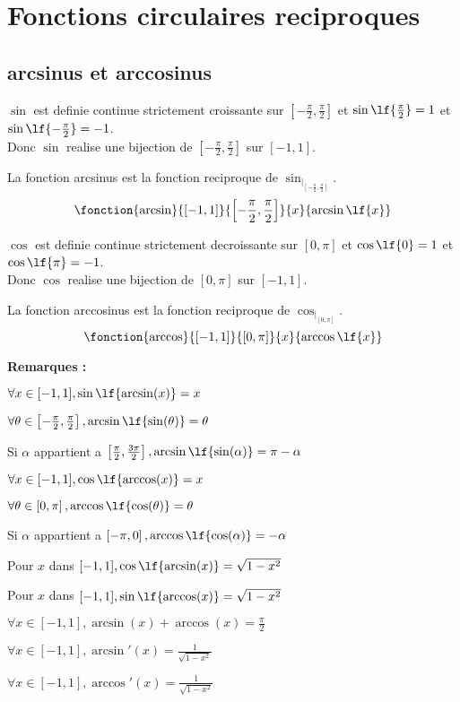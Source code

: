 \documentclass[12pt,twoside,a4paper]{article}
\begin{document}
	\section{Fonctions circulaires reciproques}
		\subsection{arcsinus et arccosinus}
			$\sin$ est definie continue strictement croissante sur $\left[-\frac{\pi}{2},\frac{\pi}{2}\right]$ et $\sin\lf{\frac{\pi}{2}}=1$ et $\sin\lf{-\frac{\pi}{2}}=-1$. \\
			Donc $\sin$ realise une bijection de $\left[-\frac{\pi}{2},\frac{\pi}{2}\right]$ sur $[-1,1]$.
			\begin{defi}
				La fonction arcsinus est la fonction reciproque de $\sin_{|_{\left[-\frac{\pi}{2},\frac{\pi}{2}\right]}}$.
				$$\fonction{\arcsin}{[-1,1]}{\left[-\frac{\pi}{2},\frac{\pi}{2}\right]}{x}{\arcsin\lf{x}}$$
			\end{defi}\newpage
			$\cos$ est definie continue strictement decroissante sur $\left[0,\pi\right]$ et $\cos\lf{0}=1$ et $\cos\lf{\pi}=-1$.\\
			Donc $\cos$ realise une bijection de $\left[0,\pi\right]$ sur $[-1,1]$.
			\begin{defi}
				La fonction arccosinus est la fonction reciproque de $\cos_{|_{\left[0,\pi\right]}}$.
				$$\fonction{\arccos}{[-1,1]}{\left[0,\pi\right]}{x}{\arccos\lf{x}}$$
			\end{defi}
			\textbf{Remarques :}
			\begin{liste}
				\item $\forall x\in[-1,1],\sin\lf{\arcsin(x)}=x$
				\item $\forall\theta\in\left[-\frac{\pi}{2},\frac{\pi}{2}\right],\arcsin\lf{\sin(\theta)}=\theta$
				\item Si $\alpha$ appartient a $\left[\frac{\pi}{2},\frac{3\pi}{2}\right],\arcsin\lf{\sin(\alpha)}=\pi-\alpha$
				\item $\forall x\in[-1,1],\cos\lf{\arccos(x)}=x$
				\item $\forall\theta\in\left[0,\pi\right],\arccos\lf{\cos(\theta)}=\theta$
				\item Si $\alpha$ appartient a $\left[-\pi,0\right],\arccos\lf{\cos(\alpha)}=-\alpha$
				\item Pour $x$ dans $[-1,1],\cos\lf{\arcsin(x)}=\sqrt{1-x^2}$
				\item Pour $x$ dans $[-1,1],\sin\lf{\arccos(x)}=\sqrt{1-x^2}$
				\item $\forall x\in[-1,1],\arcsin(x)+\arccos(x)=\frac{\pi}{2}$
				\item $\forall x\in[-1,1],\arcsin'(x)=\frac{1}{\sqrt{1-x^2}}$
				\item $\forall x\in[-1,1],\arccos'(x)=\frac{1}{\sqrt{1-x^2}}$
			\end{liste}
\end{document}
